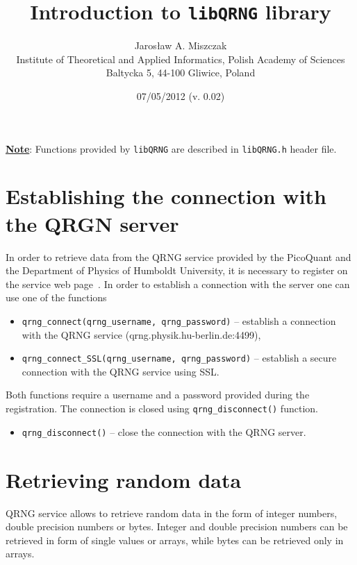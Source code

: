 \documentclass[a4paper,11pt]{article}
\title{Introduction to \texttt{libQRNG} library}
\author{Jaros{\l}aw A. Miszczak\\
Institute of Theoretical and Applied Informatics, Polish Academy of Sciences\\
Baltycka 5, 44-100 Gliwice, Poland}
\date{07/05/2012 (v. 0.02)}
\begin{document}
\maketitle

\textbf{\underline{Note}}: Functions provided by \lstinline{libQRNG} are
described in \lstinline{libQRNG.h} header file.

\section{Establishing the connection with the QRGN server}

In order to retrieve data from the QRNG service provided by the PicoQuant and
the Department of Physics of Humboldt University, it is necessary to register on
the service web page~\cite{qrng-www}. In order to establish a connection with
the server one can use one of the functions
\begin{itemize}
    \item \lstinline{qrng_connect(qrng_username, qrng_password)} -- establish a
      connection with the QRNG service (qrng.physik.hu-berlin.de:4499),

    \item \lstinline{qrng_connect_SSL(qrng_username, qrng_password)} --
      establish a secure connection with the QRNG service using SSL.
\end{itemize}
Both functions require a username and a password provided during the
registration. The connection is closed using \lstinline{qrng_disconnect()}
function.
\begin{itemize}
	\item \lstinline{qrng_disconnect()} -- close the connection with the QRNG
	server.
\end{itemize}

\section{Retrieving random data}
QRNG service allows to retrieve random data in the form of integer numbers,
double precision numbers or bytes. Integer and double precision numbers can be
retrieved in form of single values or arrays, while bytes can be retrieved only
in arrays.
\end{document}
